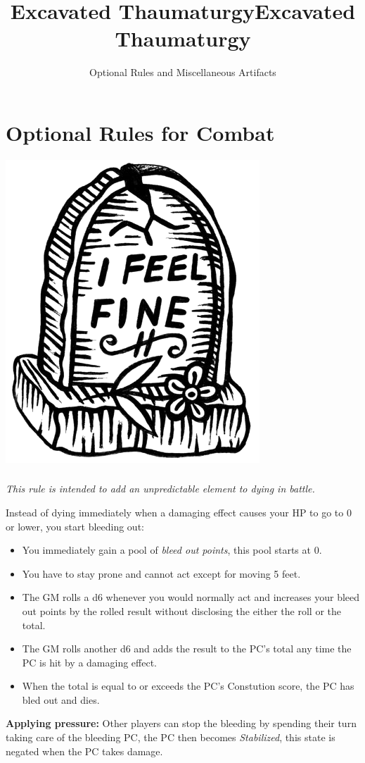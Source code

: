 \documentclass[letterpaper,sansserif,tightsqueeze]{rpg-module}
\title{Excavated Thaumaturgy}
\begin{document}
\twocolumn

\title{Excavated Thaumaturgy}

\subtitle{Optional Rules and Miscellaneous Artifacts}




\maketitle

\hyphenchar{}
\renewcommand{\arraystretch}{1.4}

\vspace{0.5cm}
\part*{Optional Rules for Combat}
\vspace{0.5cm}

\begin{center}
	\includegraphics[width = 0.3\linewidth]{dead.png}
\end{center}
\section*{}
\textit{This rule is intended to add an unpredictable element to dying in battle.}

Instead of dying immediately when a damaging effect causes your HP to go to 0 or lower, you start bleeding out:
\begin{itemize}
	\item You immediately gain a pool of \textit{bleed out points}, this pool starts at 0.
	\item You have to stay prone and cannot act except for moving 5 feet.
	\item The GM rolls a d6 whenever you would normally act and increases your bleed out points by the rolled result without disclosing the either the roll or the total.
	\item The GM rolls another d6 and adds the result to the PC's total any time the PC is hit by a damaging effect.
	\item When the total is equal to or exceeds the PC's Constution score, the PC has bled out and dies.
\end{itemize}
\textbf{Applying pressure:} Other players can stop the bleeding by spending their turn taking care of the bleeding PC, the PC then becomes \textit{Stabilized}, this state is negated when the PC takes damage.
\end{document}
